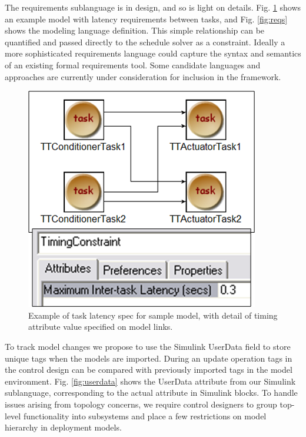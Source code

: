 The requirements sublanguage is in design, and so is light on details. Fig. \ref{fig:latency} shows an example model with latency requirements between tasks, and Fig. \ref{fig:reqs} shows the modeling language definition.  This simple relationship can be quantified and passed directly to the schedule solver as a constraint.  Ideally a more sophisticated requirements language could capture the syntax and semantics of an existing formal requirements tool.  Some candidate languages and approaches are currently under consideration for inclusion in the framework.  

\begin{figure}
	\centering
   \includegraphics[width=0.55\columnwidth]{diagrams/latency.png}
   \caption{Example of task latency spec for sample model, with detail of timing attribute value specified on model links.}
   \label{fig:latency}
\end{figure}

To track model changes we propose to use the Simulink UserData field to store unique tags when the models are imported.  During an update operation tags in the control design can be compared with previously imported tags in the model environment.  Fig. \ref{fig:userdata} shows the UserData attribute from our Simulink sublanguage, corresponding to the actual attribute in Simulink blocks.  
To handle issues arising from topology concerns, we require control designers to group top-level functionality into subsystems and place a few restrictions on model hierarchy in deployment models.


